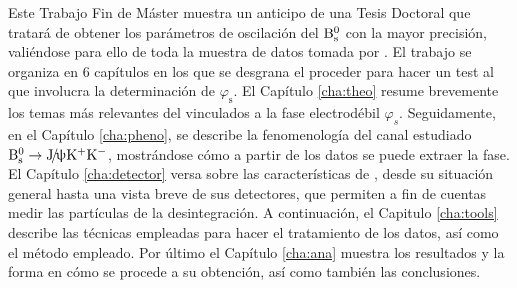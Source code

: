 Este Trabajo Fin de Máster muestra un anticipo de una Tesis Doctoral que tratará de obtener los parámetros de oscilación del $\text{B}{}_{\text{s}}^{0}$ con la mayor precisión, valiéndose para ello de toda la muestra de datos tomada por \lhcb.
El trabajo se organiza en 6 capítulos en los que se desgrana el proceder para hacer un test al \stdmod que involucra la determinación de $\varphi_{\text{s}}$. 
El Capítulo \ref{cha:theo} resume brevemente los temas más relevantes del \stdmod vinculados a la fase electrodébil $\varphi_s$. 
Seguidamente, en el Capítulo \ref{cha:pheno}, se describe la fenomenología del canal estudiado $\text{B}{}_{\text{s}}^{0} \rightarrow \text{J}\!/\!\uppsi \text{K}{}^{+}\text{K}{}^{-}$, mostrándose cómo a partir de los datos se puede extraer la fase.
El Capítulo \ref{cha:detector} versa sobre las características de \lhcb, desde su situación general hasta una vista breve de sus detectores, que permiten a fin de cuentas medir las partículas de la desintegración.
A continuación, el Capitulo \ref{cha:tools} describe las técnicas empleadas para hacer el tratamiento de los datos, así como el método empleado.
Por último el Capítulo \ref{cha:ana} muestra los resultados y la forma en cómo se procede a su obtención, así como también las conclusiones. 
%


